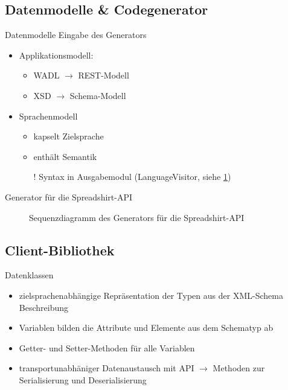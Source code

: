 \subsection{Datenmodelle \& Codegenerator}
\begin{frame}{Datenmodelle}
    Eingabe des Generators
    \begin{itemize}
        \item Applikationsmodell:
        \begin{itemize}
            \item WADL $\rightarrow{}$ REST-Modell
            \item XSD $\rightarrow{}$ Schema-Modell
        \end{itemize}
        \item Sprachenmodell
        \begin{itemize}
            \item kapselt Zielsprache
            \item enthält Semantik
            \item[!] Syntax in Ausgabemodul (LanguageVisitor, siehe \cref{sequence})
        \end{itemize}
    \end{itemize}
\end{frame}

\begin{frame}{Generator für die Spreadshirt-API}
    \begin{figure}
        \resizebox{\textwidth}{!}{
            
        }
        \caption{Sequenzdiagramm des Generators für die Spreadshirt-API}
        \label{sequence}
    \end{figure}
\end{frame}

\subsection{Client-Bibliothek}
\begin{frame}{Datenklassen}
    \begin{itemize}
        \item zielsprachenabhängige Repräsentation der Typen aus der XML-Schema Beschreibung
        \item Variablen bilden die Attribute und Elemente aus dem Schematyp ab
        \item Getter- und Setter-Methoden für alle Variablen
        \item transportunabhäniger Datenaustausch mit API $\rightarrow{}$ Methoden zur Serialisierung und Deserialisierung
    \end{itemize}
\end{frame}


